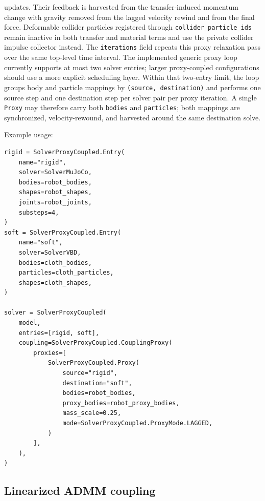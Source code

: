 \documentclass[11pt]{article}
\begin{document}
updates. Their feedback is harvested from the transfer-induced momentum change
with gravity removed from the lagged velocity rewind and from the final force.
Deformable collider particles registered through \texttt{collider\_particle\_ids}
remain inactive in both transfer and material terms and use the private collider
impulse collector instead. The \texttt{iterations} field repeats this proxy
relaxation pass over the same top-level time interval.
The implemented generic proxy loop currently supports at most two solver entries;
larger proxy-coupled configurations should use a more explicit scheduling layer.
Within that two-entry limit, the loop groups body and particle mappings by
\texttt{(source, destination)} and performs one source step and one destination
step per solver pair per proxy iteration. A single \texttt{Proxy} may therefore
carry both \texttt{bodies} and \texttt{particles}; both mappings are synchronized,
velocity-rewound, and harvested around the same destination solve.

Example usage:
\begin{verbatim}
rigid = SolverProxyCoupled.Entry(
    name="rigid",
    solver=SolverMuJoCo,
    bodies=robot_bodies,
    shapes=robot_shapes,
    joints=robot_joints,
    substeps=4,
)
soft = SolverProxyCoupled.Entry(
    name="soft",
    solver=SolverVBD,
    bodies=cloth_bodies,
    particles=cloth_particles,
    shapes=cloth_shapes,
)

solver = SolverProxyCoupled(
    model,
    entries=[rigid, soft],
    coupling=SolverProxyCoupled.CouplingProxy(
        proxies=[
            SolverProxyCoupled.Proxy(
                source="rigid",
                destination="soft",
                bodies=robot_bodies,
                proxy_bodies=robot_proxy_bodies,
                mass_scale=0.25,
                mode=SolverProxyCoupled.ProxyMode.LAGGED,
            )
        ],
    ),
)
\end{verbatim}


\subsection{Linearized ADMM coupling}
\end{document}
